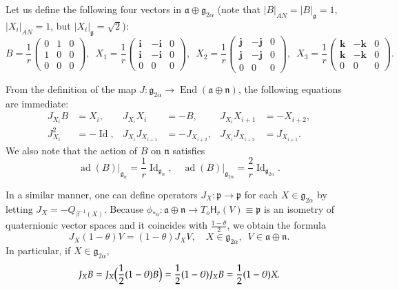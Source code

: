 \documentclass[12pt, a4paper,draft]{amsart}
\newcommand{\g}{\mathfrak}
\newcommand{\ad}{\operatorname{ad}}
\theoremstyle{remark}
\begin{document}
Let us define the following four vectors in $\g{a}\oplus\g{g}_{2\alpha}$ 
(note that $\lvert B\rvert_{AN}=\lvert B\rvert_{\g{g}}=1$, 
$\lvert X_i\rvert_{AN}=1$, but $\lvert X_i\rvert_{\g{g}}=\sqrt{2}$):
\begin{equation*}
		B=\frac{1}{r}\left(
			\begin{array}{cc|c}
				0 & 1 & 0 \\
				1 & 0 & 0 \\
				\hline
				0 & 0 & 0
			\end{array}
		\right),\enspace
		X_{1}=\frac{1}{r}\left(
		\begin{array}{cc|c}
			\mathbf{i} & -\mathbf{i} & 0 \\
			\mathbf{i} & -\mathbf{i} & 0 \\
			\hline
			0 & 0 & 0
		\end{array}
		\right), \enspace
		X_{2}=\frac{1}{r}\left(
		\begin{array}{cc|c}
			\mathbf{j} & -\mathbf{j} & 0 \\
			\mathbf{j} & -\mathbf{j} & 0 \\
			\hline
			0 & 0 & 0
		\end{array}
		\right), \enspace
		X_{3}=\frac{1}{r}\left(
		\begin{array}{cc|c}
			\mathbf{k} & -\mathbf{k} & 0 \\
			\mathbf{k} & -\mathbf{k} & 0 \\
			\hline
			0 & 0 & 0
		\end{array}
		\right).
\end{equation*}

From the definition of the map $J\colon \g{g}_{2\alpha}\to\operatorname{End}(\g{a}\oplus\g{n})$, the following equations are immediate:
\begin{align*}
J_{X_{i}}B&{}=X_{i}, 
&J_{X_{i}}X_{i}&{}=-B, 
&J_{X_{i}}X_{i+1}&{}=-X_{i+2},\\
J_{X_i}^2&{}=-\operatorname{Id},
&J_{X_i}J_{X_{i+1}}&{}=-J_{X_{i+2}}, 
&J_{X_i}J_{X_{i+2}}&{}=J_{X_{i+1}}.
\end{align*}
We also note that the action of $B$ on $\g{n}$ satisfies
\begin{equation*}
	\ad(B)\vert_{\g{g}_{\alpha}}=\frac{1}{r}\operatorname{Id}_{\g{g}_{\alpha}}, \quad \ad(B)\vert_{\g{g}_{2\alpha}}=\frac{2}{r}\operatorname{Id}_{\g{g}_{2\alpha}}.
\end{equation*}

In a similar manner, one can define operators $J_{X}\colon \g{p}\to\g{p}$ for each $X\in\g{g}_{2\alpha}$ by letting $J_{X}=-Q_{\beta^{-1}(X)}$.
Because $\phi_{*o}\colon\g{a}\oplus\g{n}\to T_{o}\mathsf{H}_{r}(V)\equiv\g{p}$ is an isometry of quaternionic vector spaces and it coincides with $\frac{1-\theta}{2}$, we obtain the formula
\begin{equation*}
	J_{X}(1-\theta)V=(1-\theta)J_{X}V, \quad X\in\g{g}_{2\alpha},\enspace V\in\g{a}\oplus\g{n}.
\end{equation*}
In particular, if $X\in\g{g}_{2\alpha}$,
\[
J_X B=J_X\Bigl(\frac{1}{2}(1-\theta)B\Bigr)=\frac{1}{2}(1-\theta)J_X B=\frac{1}{2}(1-\theta)X.
\]
\end{document}
